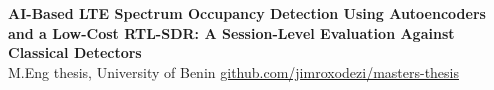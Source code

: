 \textbf{AI-Based LTE Spectrum Occupancy Detection Using Autoencoders and a Low-Cost RTL-SDR: A Session-Level Evaluation Against Classical Detectors} \\
M.Eng thesis, University of Benin \hfill \href{https://github.com/jimroxodezi/masters-thesis}{github.com/jimroxodezi/masters-thesis}
